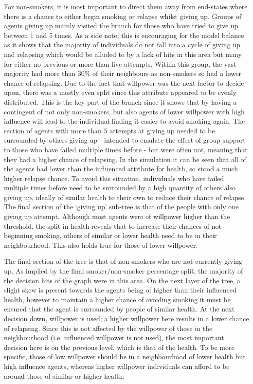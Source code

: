 \documentclass[]{report}
\begin{document}
For non-smokers, it is most important to direct them away from end-states where there is a chance to either begin smoking or relapse whilst giving up. Groups of agents giving up mainly visited the branch for those who have tried to give up between 1 and 5 times. As a side note, this is encouraging for the model balance as it shows that the majority of individuals do not fall into a cycle of giving up and relapsing which would be alluded to by a lack of hits in this area but many for either no previous or more than five attempts. Within this group, the vast majority had more than 30\% of their neighbours as non-smokers so had a lower chance of relapsing. Due to the fact that willpower was the next factor to decide upon, there was a mostly even split since this attribute appeared to be evenly distributed. This is the key part of the branch since it shows that by having a contingent of not only non-smokers, but also agents of lower willpower with high influence will lead to the individual finding it easier to avoid smoking again. The section of agents with more than 5 attempts at giving up needed to be surrounded by others giving up - intended to emulate the effect of group support to those who have failed multiple times before - but were often not, meaning that they had a higher chance of relapsing. In the simulation it can be seen that all of the agents had lower than the influenced attribute for health, so stood a much higher relapse chance. To avoid this situation, individuals who have failed multiple times before need to be surrounded by a high quantity of others also giving up, ideally of similar health to their own to reduce their chance of relapse. The final section of the `giving up' sub-tree is that of the people with only one giving up attempt. Although most agents were of willpower higher than the threshold, the split in health reveals that to increase their chances of not beginning smoking, others of similar or lower health need to be in their neighbourhood. This also holds true for those of lower willpower.

The final section of the tree is that of non-smokers who are not currently giving up. As implied by the final smoker/non-smoker percentage split, the majority of the decision hits of the graph were in this area. On the next layer of the tree, a slight skew is present towards the agents being of higher than their influenced health, however to maintain a higher chance of avoiding smoking it must be ensured that the agent is surrounded by people of similar health. At the next decision down, willpower is used; a higher willpower here results in a lower chance of relapsing. Since this is not affected by the willpower of those in the neighbourhood (i.e. influenced willpower is not used), the most important decision here is on the previous level, which is that of the health. To be more specific, those of low willpower should be in a neighbourhood of lower health but high influence agents, whereas higher willpower individuals can afford to be around those of similar or higher health.
\end{document}
